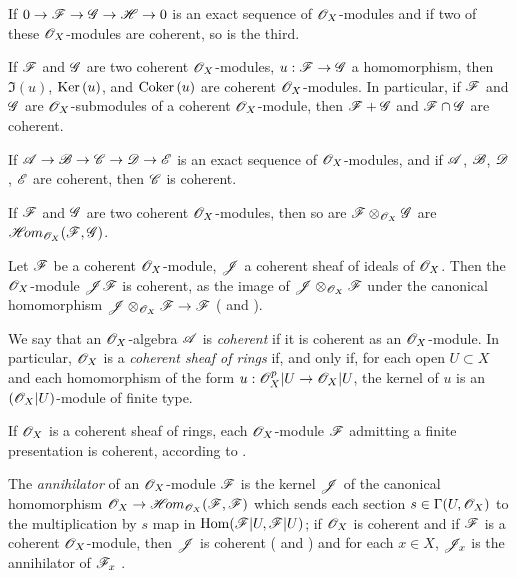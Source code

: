 \begin{env}[5.3.3]
\label{0.5.3.3}
If $0\to\mathscr{F}\to\mathscr{G}\to\mathscr{H}\to 0$ is an exact sequence  of $\mathscr{O}_X$-modules and if two of
these $\mathscr{O}_X$-modules are coherent, so is the third.
\end{env}

\begin{env}[5.3.4]
\label{0.5.3.4}
If $\mathscr{F}$ and $\mathscr{G}$ are two coherent $\mathscr{O}_X$-modules, $u:\mathscr{F}\to\mathscr{G}$ a
homomorphism, then $\Im(u)$, ${\mathop{\mathrm{Ker}}\nolimits}\,(u)$, and ${\mathop{\mathrm{Coker}}\nolimits}\,(u)$ are coherent $\mathscr{O}_X$-modules. In
particular, if $\mathscr{F}$ and $\mathscr{G}$ are $\mathscr{O}_X$-submodules of a coherent $\mathscr{O}_X$-module,
then $\mathscr{F}+\mathscr{G}$ and $\mathscr{F}\cap\mathscr{G}$ are coherent.

If $\mathscr{A}\to\mathscr{B}\to\mathscr{C}\to\mathscr{D}\to\mathscr{E}$ is an exact sequence of $\mathscr{O}_X$-modules, and
if $\mathscr{A}$, $\mathscr{B}$, $\mathscr{D}$, $\mathscr{E}$ are coherent, then $\mathscr{C}$ is coherent.
\end{env}

\begin{env}[5.3.5]
\label{0.5.3.5}
If $\mathscr{F}$ and $\mathscr{G}$ are two coherent $\mathscr{O}_X$-modules, then so are
$\mathscr{F}\otimes_{\mathscr{O}_X}\mathscr{G}$ are $\mathscr{H}\!{om}_{\mathscr{O}_X}(\mathscr{F},\mathscr{G})$.
\end{env}

\begin{env}[5.3.6]
\label{0.5.3.6}
Let $\mathscr{F}$ be a coherent $\mathscr{O}_X$-module, $\mathscr{J}$ a coherent sheaf of ideals of $\mathscr{O}_X$.
Then the $\mathscr{O}_X$-module $\mathscr{J}\mathscr{F}$ is coherent, as the image of
$\mathscr{J}\otimes_{\mathscr{O}_X}\mathscr{F}$ under the canonical homomorphism
$\mathscr{J}\otimes_{\mathscr{O}_X}\mathscr{F}\to\mathscr{F}$ ( and ).
\end{env}

\begin{env}[5.3.7]
\label{0.5.3.7}
We say that an $\mathscr{O}_X$-algebra $\mathscr{A}$ is {\em coherent} if it is coherent as an
$\mathscr{O}_X$-module. In particular, $\mathscr{O}_X$ is a {\em coherent sheaf of rings} if, and only if,
for each open $U\subset X$ and each homomorphism of the form $u:\mathscr{O}_X^p|U\to\mathscr{O}_X|U$, the
kernel of $u$ is an $(\mathscr{O}_X|U)$-module of finite type.

If $\mathscr{O}_X$ is a coherent sheaf of rings, each $\mathscr{O}_X$-module $\mathscr{F}$ admitting a finite
presentation  is coherent, according to .

The {\em annihilator} of an $\mathscr{O}_X$-module $\mathscr{F}$ is the kernel $\mathscr{J}$ of the canonical
homomorphism $\mathscr{O}_X\to\mathscr{H}\!{om}_{\mathscr{O}_X}(\mathscr{F},\mathscr{F})$ which sends each section
$s\in\Gamma(U,\mathscr{O}_X)$ to the multiplication by $s$ map in ${\mathop{\mathrm{Hom}}\nolimits}(\mathscr{F}|U,\mathscr{F}|U)$; if
$\mathscr{O}_X$ is coherent and if $\mathscr{F}$ is a coherent $\mathscr{O}_X$-module, then $\mathscr{J}$ is coherent
( and ) and for each $x\in X$, $\mathscr{J}_x$ is the
annihilator of $\mathscr{F}_x$ .
\end{env}


